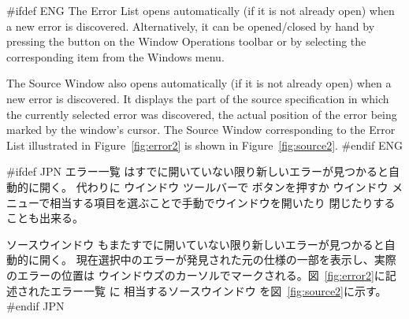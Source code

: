 \documentclass[\pformat,12pt]{article}
\newcommand{\guicmd}[1]{{\sf #1}}
\newcommand{\guicmd}[1]{{\gt #1}}
\begin{document}
#ifdef ENG
The \guicmd{Error List} opens automatically (if it is not already
open) when a new error is discovered. Alternatively, it can be
opened/closed by hand by pressing the  
button on the \guicmd{Window Operations} toolbar or by
selecting the corresponding item from the \guicmd{Windows} menu.

The \guicmd{Source Window} also opens automatically (if it is not
already open) when a new error is discovered. It displays the part of 
the source specification in which the currently selected error was
discovered, the actual position of the error being marked by the
window's cursor. The \guicmd{Source Window} corresponding to the
\guicmd{Error List} illustrated in Figure~\ref{fig:error2} is shown in  
Figure~\ref{fig:source2}.
#endif ENG

#ifdef JPN
\guicmd{エラー一覧} はすでに開いていない限り新しいエラーが見つかると自動的に開く。
代わりに \guicmd{ウインドウ} ツールバーで 
ボタンを押すか
\guicmd{ウインドウ} メニューで相当する項目を選ぶことで手動でウインドウを開いたり
閉じたりすることも出来る。

\guicmd{ソースウインドウ} もまたすでに開いていない限り新しいエラーが見つかると自動的に開く。
現在選択中のエラーが発見された元の仕様の一部を表示し、実際のエラーの位置は
ウインドウズのカーソルでマークされる。図~\ref{fig:error2}に記述された\guicmd{エラー一覧} に
相当する\guicmd{ソースウインドウ} を図~\ref{fig:source2}に示す。
#endif JPN
\end{document}
